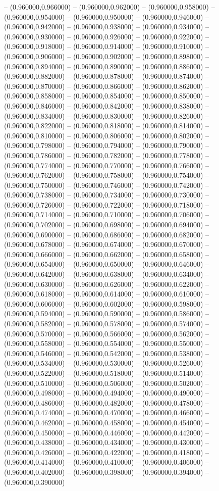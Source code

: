 -- (0.960000,0.966000) -- (0.960000,0.962000) -- (0.960000,0.958000) -- (0.960000,0.954000) -- (0.960000,0.950000) -- (0.960000,0.946000) -- (0.960000,0.942000) -- (0.960000,0.938000) -- (0.960000,0.934000) -- (0.960000,0.930000) -- (0.960000,0.926000) -- (0.960000,0.922000) -- (0.960000,0.918000) -- (0.960000,0.914000) -- (0.960000,0.910000) -- (0.960000,0.906000) -- (0.960000,0.902000) -- (0.960000,0.898000) -- (0.960000,0.894000) -- (0.960000,0.890000) -- (0.960000,0.886000) -- (0.960000,0.882000) -- (0.960000,0.878000) -- (0.960000,0.874000) -- (0.960000,0.870000) -- (0.960000,0.866000) -- (0.960000,0.862000) -- (0.960000,0.858000) -- (0.960000,0.854000) -- (0.960000,0.850000) -- (0.960000,0.846000) -- (0.960000,0.842000) -- (0.960000,0.838000) -- (0.960000,0.834000) -- (0.960000,0.830000) -- (0.960000,0.826000) -- (0.960000,0.822000) -- (0.960000,0.818000) -- (0.960000,0.814000) -- (0.960000,0.810000) -- (0.960000,0.806000) -- (0.960000,0.802000) -- (0.960000,0.798000) -- (0.960000,0.794000) -- (0.960000,0.790000) -- (0.960000,0.786000) -- (0.960000,0.782000) -- (0.960000,0.778000) -- (0.960000,0.774000) -- (0.960000,0.770000) -- (0.960000,0.766000) -- (0.960000,0.762000) -- (0.960000,0.758000) -- (0.960000,0.754000) -- (0.960000,0.750000) -- (0.960000,0.746000) -- (0.960000,0.742000) -- (0.960000,0.738000) -- (0.960000,0.734000) -- (0.960000,0.730000) -- (0.960000,0.726000) -- (0.960000,0.722000) -- (0.960000,0.718000) -- (0.960000,0.714000) -- (0.960000,0.710000) -- (0.960000,0.706000) -- (0.960000,0.702000) -- (0.960000,0.698000) -- (0.960000,0.694000) -- (0.960000,0.690000) -- (0.960000,0.686000) -- (0.960000,0.682000) -- (0.960000,0.678000) -- (0.960000,0.674000) -- (0.960000,0.670000) -- (0.960000,0.666000) -- (0.960000,0.662000) -- (0.960000,0.658000) -- (0.960000,0.654000) -- (0.960000,0.650000) -- (0.960000,0.646000) -- (0.960000,0.642000) -- (0.960000,0.638000) -- (0.960000,0.634000) -- (0.960000,0.630000) -- (0.960000,0.626000) -- (0.960000,0.622000) -- (0.960000,0.618000) -- (0.960000,0.614000) -- (0.960000,0.610000) -- (0.960000,0.606000) -- (0.960000,0.602000) -- (0.960000,0.598000) -- (0.960000,0.594000) -- (0.960000,0.590000) -- (0.960000,0.586000) -- (0.960000,0.582000) -- (0.960000,0.578000) -- (0.960000,0.574000) -- (0.960000,0.570000) -- (0.960000,0.566000) -- (0.960000,0.562000) -- (0.960000,0.558000) -- (0.960000,0.554000) -- (0.960000,0.550000) -- (0.960000,0.546000) -- (0.960000,0.542000) -- (0.960000,0.538000) -- (0.960000,0.534000) -- (0.960000,0.530000) -- (0.960000,0.526000) -- (0.960000,0.522000) -- (0.960000,0.518000) -- (0.960000,0.514000) -- (0.960000,0.510000) -- (0.960000,0.506000) -- (0.960000,0.502000) -- (0.960000,0.498000) -- (0.960000,0.494000) -- (0.960000,0.490000) -- (0.960000,0.486000) -- (0.960000,0.482000) -- (0.960000,0.478000) -- (0.960000,0.474000) -- (0.960000,0.470000) -- (0.960000,0.466000) -- (0.960000,0.462000) -- (0.960000,0.458000) -- (0.960000,0.454000) -- (0.960000,0.450000) -- (0.960000,0.446000) -- (0.960000,0.442000) -- (0.960000,0.438000) -- (0.960000,0.434000) -- (0.960000,0.430000) -- (0.960000,0.426000) -- (0.960000,0.422000) -- (0.960000,0.418000) -- (0.960000,0.414000) -- (0.960000,0.410000) -- (0.960000,0.406000) -- (0.960000,0.402000) -- (0.960000,0.398000) -- (0.960000,0.394000) -- (0.960000,0.390000) 